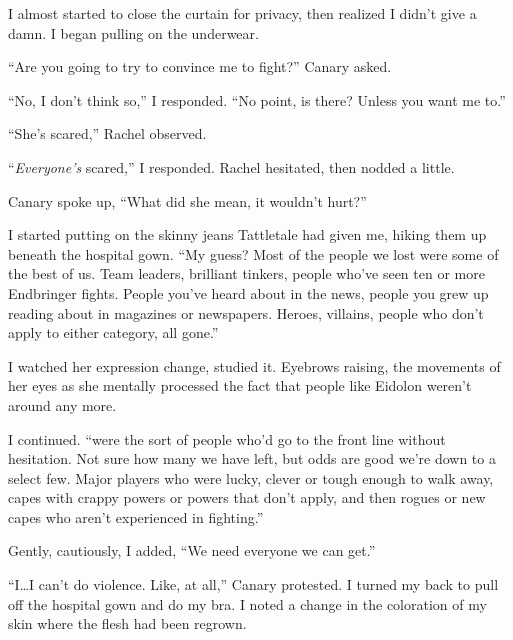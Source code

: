 I almost started to close the curtain for privacy, then realized I didn't give a damn.  I began pulling on the underwear.



``Are you going to try to convince me to fight?'' Canary asked.



``No, I don't think so,'' I responded.  ``No point, is there?  Unless you want me to.''



``She's scared,'' Rachel observed.



``\emph{Everyone's} scared,'' I responded.  Rachel hesitated, then nodded a little.



Canary spoke up, ``What did she mean, it wouldn't hurt?''



I started putting on the skinny jeans Tattletale had given me, hiking them up beneath the hospital gown.  ``My guess?  Most of the people we lost were some of the best of us.  Team leaders, brilliant tinkers, people who've seen ten or more Endbringer fights.  People you've heard about in the news, people you grew up reading about in magazines or newspapers.  Heroes, villains, people who don't apply to either category, all gone.''



I watched her expression change, studied it.  Eyebrows raising, the movements of her eyes as she mentally processed the fact that people like Eidolon weren't around any more.



I continued.  ``\ldotsThey were the sort of people who'd go to the front line without hesitation.  Not sure how many we have left, but odds are good we're down to a select few.  Major players who were lucky, clever or tough enough to walk away, capes with crappy powers or powers that don't apply, and then rogues or new capes who aren't experienced in fighting.''



Gently, cautiously, I added, ``We need everyone we can get.''



``I\ldots I can't do violence.  Like, at all,'' Canary protested.  I turned my back to pull off the hospital gown and do my bra.  I noted a change in the coloration of my skin where the flesh had been regrown.



